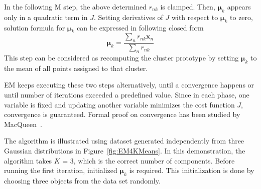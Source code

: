 In the following M step, the above determined \(r_{nk}\) is clamped. Then, \(\boldsymbol{\mu}_k\) appears only in a quadratic term in \(J\). Setting derivatives of \(J\) with respect to \(\boldsymbol{\mu}_k\) to zero, solution formula for \(\boldsymbol{\mu}_k\) can be expressed in following closed form
\begin{equation}
	\label{eq:muupdate}
	\boldsymbol{\mu}_{k} = \frac{\sum_n r_{nk}\mathbf{x}_n}{\sum_n r_{nk}}
\end{equation}
This step can be considered as recomputing the cluster prototype by setting \(\boldsymbol{\mu}_k\) to the mean of all points assigned to that cluster. 

EM keeps executing these two steps alternatively, until a convergence happens or until number of iterations exceeded a predefined value. Since in each phase, one variable is fixed and updating another variable minimizes the cost function \(J\), convergence is guaranteed. Formal proof on convergence has been studied by MacQueen~\cite{macqueen1967some}.

The algorithm is illustrated using dataset generated independently from three Gaussian distributions in Figure~\ref{fig:EM4KMeans}. In this demonstration, the algorithm takes \(K\) = 3, which is the correct number of components. Before running the first iteration, initialized \(\boldsymbol{\mu}_k\) is required. This initialization is done by choosing three objects from the data set randomly.

